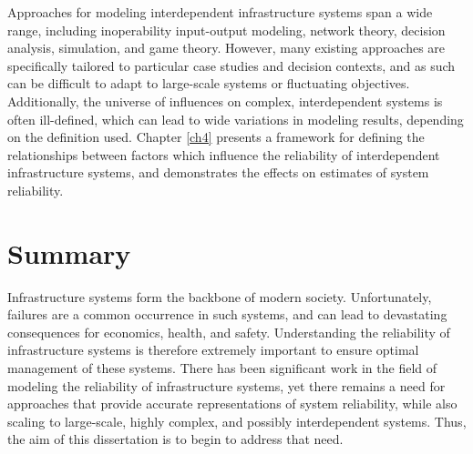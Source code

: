 Approaches for modeling interdependent infrastructure systems span a wide range, including inoperability input-output modeling, network theory, decision analysis, simulation, and game theory. However, many existing approaches are specifically tailored to particular case studies and decision contexts, and as such can be difficult to adapt to large-scale systems or fluctuating objectives.  Additionally, the universe of influences on complex, interdependent systems is often ill-defined, which can lead to wide variations in modeling results, depending on the definition used.  Chapter \ref{ch4} presents a framework for defining the relationships between factors which influence the reliability of interdependent infrastructure systems, and demonstrates the effects on estimates of system reliability.


\section{Summary}
\label{sec:ch1:summary}

Infrastructure systems form the backbone of modern society.  Unfortunately, failures are a common occurrence in such systems, and can lead to devastating consequences for economics, health, and safety.  Understanding the reliability of infrastructure systems is therefore extremely important to ensure optimal management of these systems.  There has been significant work in the field of modeling the reliability of infrastructure systems, yet there remains a need for approaches that provide accurate representations of system reliability, while also scaling to large-scale, highly complex, and possibly interdependent systems.  Thus, the aim of this dissertation is to begin to address that need.

